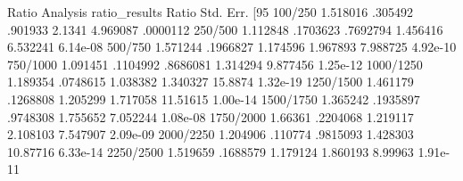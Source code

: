 Ratio Analysis
	ratio_results					
	Ratio	Std. Err.	[95%
100/250	1.518016	.305492	.901933	2.1341	4.969087	.0000112
250/500	1.112848	.1703623	.7692794	1.456416	6.532241	6.14e-08
500/750	1.571244	.1966827	1.174596	1.967893	7.988725	4.92e-10
750/1000	1.091451	.1104992	.8686081	1.314294	9.877456	1.25e-12
1000/1250	1.189354	.0748615	1.038382	1.340327	15.8874	1.32e-19
1250/1500	1.461179	.1268808	1.205299	1.717058	11.51615	1.00e-14
1500/1750	1.365242	.1935897	.9748308	1.755652	7.052244	1.08e-08
1750/2000	1.66361	.2204068	1.219117	2.108103	7.547907	2.09e-09
2000/2250	1.204906	.110774	.9815093	1.428303	10.87716	6.33e-14
2250/2500	1.519659	.1688579	1.179124	1.860193	8.99963	1.91e-11
